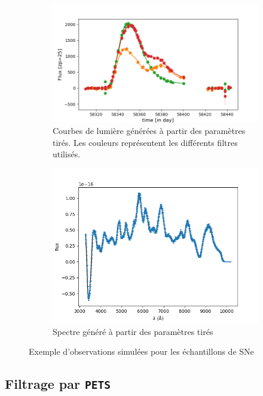 \documentclass{book}
\def\pets{\texttt{PETS}\xspace}
\begin{document}
\begin{figure}[h]
	\centering
	\begin{subfigure}[c]{0.5\textwidth}
		\includegraphics[width=\textwidth]{figures/276_lc_truth.png}
		\caption{Courbes de lumière générées à partir des paramètres tirés. Les couleurs représentent les différents filtres utilisés.}
		\label{fig:lc}
	\end{subfigure}
	\hfill
	\begin{subfigure}[c]{0.45\textwidth}
		\centering
		\includegraphics[width=\textwidth]{figures/gen_spec.png}
		\caption{Spectre généré à partir des paramètres tirés}
		\label{fig:spectra}
	\end{subfigure}
	\label{fig:obs}
	\caption{Exemple d'observations simulées pour les échantillons de SNe}
\end{figure}

\subsection{Filtrage par \pets}
\end{document}
